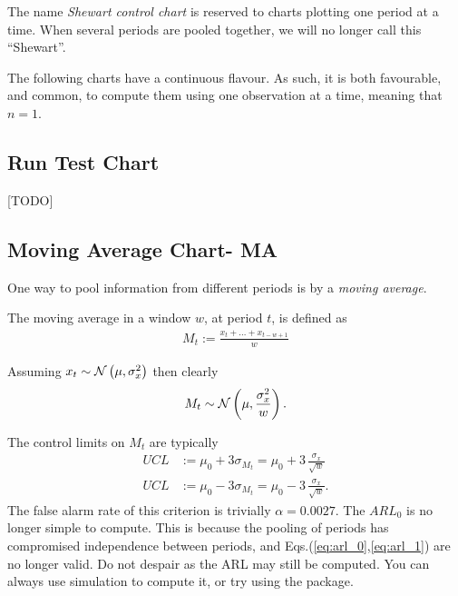 \begin{remark}
The name \emph{Shewart control chart} is reserved to charts plotting one period at a time. 
When several periods are pooled together, we will no longer call this  ``Shewart''.
\end{remark}

\begin{remark}
The following charts have a continuous flavour. As such, it is both favourable, and common, to compute them using one observation at a time, meaning that $n=1$. 
\end{remark}



\subsection{Run Test Chart}
[TODO]




\subsection{Moving Average Chart- MA}
One way to pool information from different periods is by a \emph{moving average}.
\begin{definition}
The moving average in a window $w$, at period $t$, is defined as
\begin{align}
	M_t:= \frac{x_t+\dots+x_{t-w+1}}{w}
\end{align}
\end{definition}
Assuming $x_t \sim \mathcal{N}\left(\mu, \sigma_x^2\right)$ then clearly 
\begin{align}
	M_t \sim \mathcal{N}\left(\mu, \frac{\sigma_x^2}{w}\right).
\end{align}

The control limits on $M_t$ are typically
\begin{align}
	UCL &:= \mu_0 + 3 \sigma_{M_t}= \mu_0 + 3 \, \frac{\sigma_x}{\sqrt{w}} \\
	UCL &:= \mu_0 - 3 \sigma_{M_t}= \mu_0 - 3 \, \frac{\sigma_x}{\sqrt{w}}.
\end{align}
The false alarm rate of this criterion is trivially $\alpha=0.0027$. 
The $ARL_0$ is no longer simple to compute. 
This is because the pooling of periods has compromised independence between periods, and Eqs.(\ref{eq:arl_0},\ref{eq:arl_1}) are no longer valid. 
Do not despair as the ARL may still be computed. 
You can always use simulation to compute it, or try using the  \R package.


